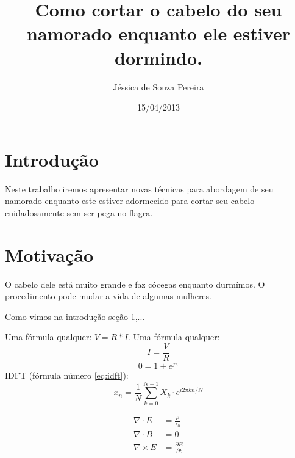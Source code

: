 \documentclass{article}
\author{Jéssica de Souza Pereira}
\date{15/04/2013}
\title{Como cortar o cabelo do seu namorado enquanto ele estiver dormindo.}
\begin{document}
\maketitle
\newpage
\section{Introdução}
\label{sec:intro}
Neste trabalho iremos apresentar novas técnicas para abordagem de seu namorado enquanto este estiver adormecido para cortar seu cabelo cuidadosamente sem ser pega no flagra.
\section{Motivação}
\label{sec:motiv}
O cabelo dele está muito grande e faz cócegas enquanto durmímos. O procedimento pode mudar a vida de algumas mulheres.

Como vimos na introdução {seção \ref{sec:intro}},...

Uma fórmula qualquer: $V = R*I$.
Uma fórmula qualquer: $$I = \frac{V}{R}$$
$$0=1+e^{j\pi}$$
IDFT (fórmula número \ref{eq:idft}):
\begin{equation}
\label{eq:idft}
x_n = \frac{1}{N}\sum_{k = 0}^{N-1} X_k \cdot e^{i2\pi kn/N}
\end{equation}

\begin{align}
\nabla \cdot E & = \frac{\rho}{\epsilon_0} \\
\nabla \cdot B & = 0 \\
\nabla \times E & = \frac{\partial B}{\partial t}
\end{align}
\end{document}
